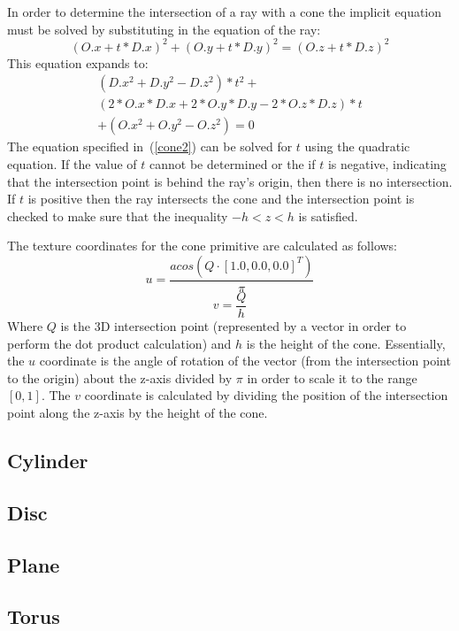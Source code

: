 In order to determine the intersection of a ray with a cone the implicit
equation must be solved by substituting in the equation of the ray:
\begin{equation}
  (O.x + t*D.x)^2 + (O.y + t*D.y)^2 = (O.z + t*D.z)^2\label{cone1}
\end{equation}
This equation expands to:
\begin{equation}
\begin{split}
  (D.x^2 + D.y^2 - D.z^2)*t^2 + \\
  (2*O.x*D.x + 2*O.y*D.y - 2*O.z*D.z)*t \\
  + (O.x^2 + O.y^2 - O.z^2) = 0\label{cone2}
\end{split}
\end{equation}
The equation specified in~(\ref{cone2}) can be solved for $t$ using the
quadratic equation. If the value of $t$ cannot be determined or the if $t$ is
negative, indicating that the intersection point is behind the ray's origin,
then there is no intersection. If $t$ is positive then the ray intersects the
cone and the intersection point is checked to make sure that the inequality $-h
< z < h$ is satisfied.

The texture coordinates for the cone primitive are calculated as follows:
\begin{equation}
  u = \frac{acos(Q \cdot [1.0, 0.0, 0.0]^T)}{\pi}
\end{equation}
\begin{equation}
  v = \frac{Q}{h}
\end{equation}
Where $Q$ is the 3D intersection point (represented by a vector in order to
perform the dot product calculation) and $h$ is the height of the cone.
Essentially, the $u$ coordinate is the angle of rotation of the vector (from
the intersection point to the origin) about the z-axis divided by $\pi$ in 
order to scale it to the range $[0, 1]$. The $v$ coordinate is calculated by
dividing the position of the intersection point along the z-axis by the height
of the cone.

\subsection*{Cylinder}

\subsection*{Disc}

\subsection*{Plane}

\subsection*{Torus}


